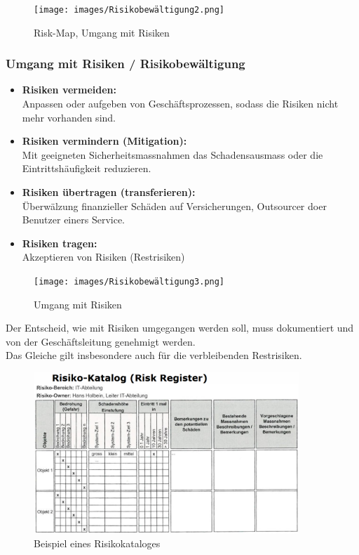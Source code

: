 \documentclass[10pt,a4paper]{article}
\begin{document}
\begin{figure}[H]
    \begin{center}
    \texttt{[image: images/Risikobewältigung2.png]}
    \caption{Risk-Map, Umgang mit Risiken}
    \label{Risk-Map2}
    \end{center}
\end{figure}

\subsubsection*{Umgang mit Risiken / Risikobewältigung }
\begin{itemize}[noitemsep,topsep=0pt,leftmargin=*]
    \item \textbf{Risiken vermeiden:}\\Anpassen oder aufgeben von Geschäftsprozessen, sodass die Risiken nicht mehr vorhanden sind.
    \item \textbf{Risiken vermindern (Mitigation):}\\Mit geeigneten Sicherheitsmassnahmen das Schadensausmass oder die Eintrittshäufigkeit reduzieren.
    \item \textbf{Risiken übertragen (transferieren):}\\Überwälzung finanzieller Schäden auf Versicherungen, Outsourcer doer Benutzer einers Service.
    \item \textbf{Risiken tragen:}\\Akzeptieren von Risiken (Restrisiken)
\end{itemize}

\begin{figure}[H]
    \begin{center}
    \texttt{[image: images/Risikobewältigung3.png]}
    \caption{Umgang mit Risiken}
    \label{Umgang mit Risiken}
    \end{center}
\end{figure}
\noindent
Der Entscheid, wie mit Risiken umgegangen werden soll, muss dokumentiert und von der Geschäftsleitung genehmigt werden.\\Das Gleiche gilt insbesondere auch für die verbleibenden Restrisiken.
\begin{figure}[H]
    \begin{center}
    \includegraphics[width=10cm]{images/Risiko-Katalog.png}
    \caption{Beispiel eines Risikokataloges}
    \label{risikokatalog}
    \end{center}
\end{figure}
\end{document}
